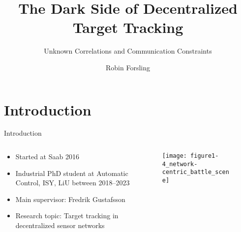 \documentclass[aspectratio=1610]{beamer}
\title[Decentralized Target Tracking]{\Large The Dark Side of Decentralized Target Tracking}
\subtitle{\normalsize Unknown Correlations and Communication Constraints} %
\author{Robin Forsling}
\institute[]{%
}
\date[]{%
}
\begin{document}
\thispagestyle{empty}
\begin{frame}
    \titlepage
\end{frame}



\addtocounter{framenumber}{-1}





\section{Introduction}



\begin{frame}{Introduction}

\begin{columns}

\begin{column}{.5\textwidth}
    \begin{itemize}
        \item Started at Saab 2016
        \item Industrial PhD student at Automatic Control, ISY, LiU between 2018--2023
        \item Main supervisor: Fredrik Gustafsson
        \item Research topic: Target tracking in decentralized sensor networks
    \end{itemize}
\end{column}

\begin{column}{.5\textwidth}

    \begin{figure}
        \centering
        \texttt{[image: figure1-4\_network-centric\_battle\_scene]}
    \end{figure}

\end{column}

\end{columns}

\end{frame}
\end{document}
